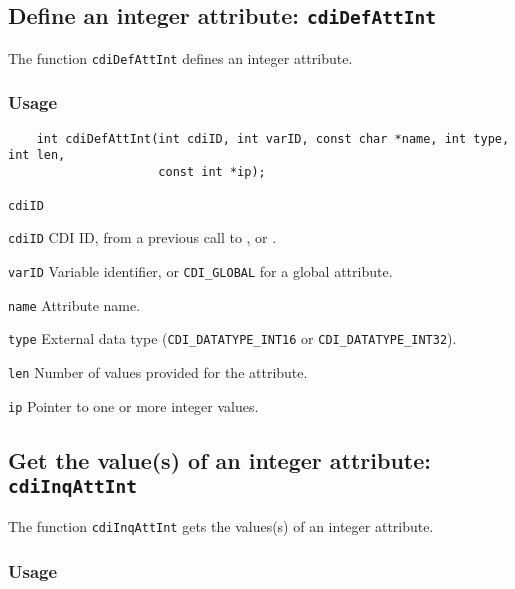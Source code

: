 \subsection{Define an integer attribute: \texttt{cdiDefAttInt}}
\label{cdiDefAttInt}

The function {\texttt{cdiDefAttInt}} defines an integer attribute.

\subsubsection*{Usage}

\begin{verbatim}
    int cdiDefAttInt(int cdiID, int varID, const char *name, int type, int len, 
                     const int *ip);
\end{verbatim}

\hspace*{4mm}\begin{minipage}[]{15cm}
\begin{deflist}{\texttt{cdiID}\ }
\item[\texttt{cdiID}]
CDI ID, from a previous call to {}, {} or {}.
\item[\texttt{varID}]
Variable identifier, or {\texttt{CDI\_GLOBAL}} for a global attribute.
\item[\texttt{name}]
Attribute name.
\item[\texttt{type}]
External data type ({\texttt{CDI\_DATATYPE\_INT16}} or {\texttt{CDI\_DATATYPE\_INT32}}).
\item[\texttt{len}]
Number of values provided for the attribute.
\item[\texttt{ip}]
Pointer to one or more integer values.

\end{deflist}
\end{minipage}


\subsection{Get the value(s) of an integer attribute: \texttt{cdiInqAttInt}}
\label{cdiInqAttInt}

The function {\texttt{cdiInqAttInt}} gets the values(s) of an integer attribute.

\subsubsection*{Usage}

